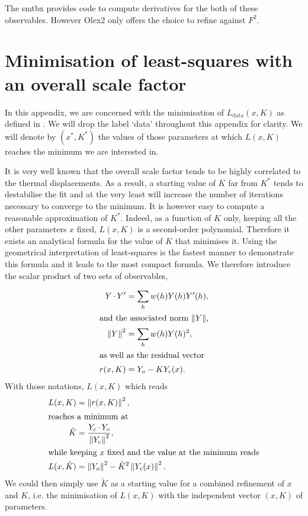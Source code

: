 \documentclass[pdf]{iucr}
\begin{document}
The smtbx provides code to compute derivatives for the both of these observables. However Olex2 only offers the choice to refine against $F^2$.

\section{Minimisation of least-squares with an overall scale factor}
\label{appendix:leastsquaresminimisation}

In this appendix, we are concerned with the minimisation of $L_\text{data}(x, K)$ as defined in . We will drop the label `data' throughout this appendix for clarity. We will denote by $(x^*, K^*)$ the values of those parameters at which $L(x,K)$ reaches the minimum we are interested in.

It is very well known that the overall scale factor tends to be highly correlated to the thermal displacements. As a result, a starting value of $K$ far from $K^*$ tends to destabilise the fit and at the very least will increase the number of iterations necessary to converge to the minimum. It is however easy to compute a reasonable approximation of $K^*$. Indeed, as a function of $K$ only, keeping all the other parameters $x$ fixed, $L(x, K)$ is a second-order polynomial. Therefore it exists an analytical formula for the value of $K$ that minimises it. Using the geometrical interpretation of least-squares is the fastest manner to demonstrate this formula and it leads to the most compact formula. We therefore introduce the scalar product of two sets of observables,

\begin{align}
Y \operatorname{\cdot} Y' &= \sum_h w(h) Y(h) Y'(h), \\
\intertext{and the associated norm $\left\| Y \right\|$,}
\left\| Y \right\|^2 &= \sum_h w(h) Y(h)^2, \\
\intertext{as well as the residual vector}
r(x, K) &= Y_o - K Y_c(x).
\label{eqn:lsresidualdef}
\end{align}
With those notations, $L(x, K)$ which reads
\begin{align}
L(x, K) &= \left\| r(x, K) \right\|^2, \\
\intertext{reaches a minimum at}
\tilde{K} &= \frac{Y_c \operatorname{\cdot} Y_o}{\left\| Y_c \right\|^2},
\label{eqn:tildeK}
\\
\intertext{while keeping $x$ fixed and the value at the minimum reads}
L(x, \tilde{K}) &= \left\| Y_o \right\|^2 - \tilde{K}^2 \left\| Y_c(x) \right\|^2.
\end{align}
We could then simply use $\tilde{K}$ as a starting value for a combined refinement of $x$ and $K$, i.e. the minimisation of $L(x, K)$ with the independent vector $(x, K)$ of parameters.
\end{document}
